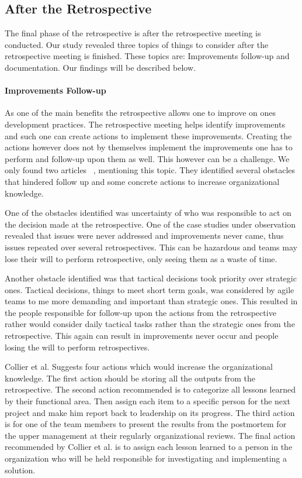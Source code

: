 \documentclass[12pt]{article}
\begin{document}
\subsection{After the Retrospective}
The final phase of the retrospective is after the retrospective meeting is conducted. Our study revealed three topics of things to consider after the retrospective meeting is finished. These topics are: Improvements follow-up and documentation. Our findings will be described below.

\paragraph{Improvements Follow-up}
As one of the main benefits the retrospective allows one to improve on ones development practices. The retrospective meeting helps identify improvements and such one can create actions to implement these improvements. Creating the actions however does not by themselves implement the improvements one has to perform and follow-up upon them as well. This however can be a challenge. We only found two articles ~\cite{Drury2012, Collier1996}, mentioning this topic. They identified several obstacles that hindered follow up and some concrete actions to increase organizational knowledge. 

One of the obstacles identified was uncertainty of who was responsible to act on the decision made at the retrospective. One of the case studies under observation revealed that issues were never addressed and improvements never came, thus issues repeated over several retrospectives. This can be hazardous and teams may lose their will to perform retrospective, only seeing them as a waste of time. 

Another obstacle identified was that tactical decisions took priority over strategic ones. Tactical decisions, things to meet short term goals, was considered by agile teams to me more demanding and important than strategic ones. This resulted in the people responsible for follow-up upon the actions from the retrospective rather would consider daily tactical tasks rather than the strategic ones from the retrospective. This again can result in improvements never occur and people losing the will to perform retrospectives. 

Collier et al. Suggests four actions which would increase the organizational knowledge. The first action should be storing all the outputs from the retrospective. The second action recommended is to categorize all lessons learned by their functional area. Then assign each item to a specific person for the next project and make him report back to leadership on its progress. The third action is for one of the team members to present the results from the postmortem for the upper management at their regularly organizational reviews. The final action recommended by Collier et al. is to assign each lesson learned to a person in the organization who will be held responsible for investigating and implementing a solution. 
\end{document}

